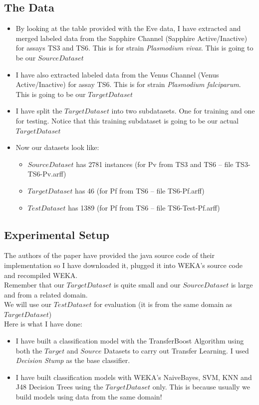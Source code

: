 \documentclass[a4paper,12pt, english]{article}
\begin{document}
\subsection{The Data}
\begin{itemize}
\item By looking at the table provided with the Eve data, I have extracted and merged labeled data from the Sapphire Channel (Sapphire Active/Inactive) for assays TS3 and TS6. This is for strain \emph{Plasmodium vivax}. This is going to be our $Source Dataset$

\item I have also extracted labeled data from the Venus Channel (Venus Active/Inactive) for assay TS6. This is for strain \emph{Plasmodium falciparum}. This is going to be our $Target Dataset$
\item I have split the $Target Dataset$ into two subdatasets. One for training and one for testing. Notice that this training subdataset is going to be our actual $Target Dataset$
\item Now our datasets look like:
   \begin{itemize}
	\item $Source Dataset$ has 2781 instances (for Pv from TS3 and TS6 -- file TS3-TS6-Pv.arff)
	\item $Target Dataset$ has 46 (for Pf from TS6 -- file TS6-Pf.arff)
	\item $Test Dataset$ has 1389 (for Pf from TS6 -- file TS6-Test-Pf.arff)
   \end{itemize}  
\end{itemize}  

\subsection{Experimental Setup}
The authors of the paper have provided the java source code of their implementation so I have downloaded it, plugged it into WEKA's source code and recompiled WEKA.\\
Remember that our $Target Dataset$ is quite small and our $Source Dataset$ is large and from a related domain.\\
We will use our $Test Dataset$ for evaluation (it is from the same domain as $Target Dataset$)\\

Here is what I have done:
\begin{itemize}
\item I have built a classification model with the TransferBoost Algorithm using both the $Target$ and $Source$ Datasets to carry out Transfer Learning. I used \emph{Decision Stump} as the base classifier.
\item I have built classification models with WEKA's NaiveBayes, SVM, KNN and J48 Decision Trees using the $Target Dataset$ only. This is because usually we build models using data from the same domain!
\end{itemize}
\end{document}

